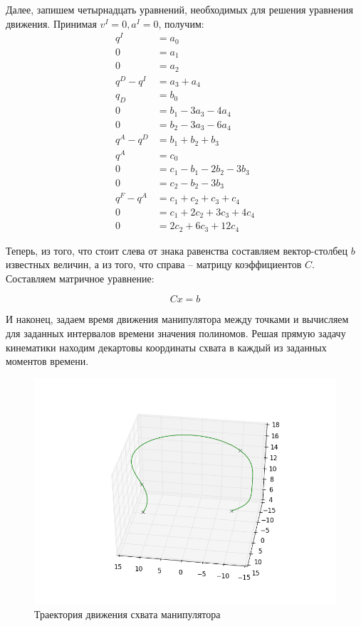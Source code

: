 \documentclass[a4paper,14pt]{extreport}
\begin{document}
	Далее, запишем четырнадцать уравнений, необходимых для решения уравнения движения. Принимая $v^I = 0, a^I = 0$, получим:
	\begin{align*}
		q^I &= a_0\\
		0 &= a_1\\
		0 &= a_2\\
		q^D - q^I &= a_3 + a_4\\
		q_D &= b_0\\
		0 &= b_1 - 3 a_3 - 4 a_4\\
		0 &= b_2 - 3 a_3 - 6 a_4\\
		q^A - q^D &= b_1 + b_2 + b_3\\
		q^A &= c_0\\
		0 &= c_1 - b_1 - 2 b_2 -3 b_3\\
		0 &= c_2 - b_2 - 3 b_3\\
		q^F - q^A &= c_1 + c_2 + c_3 + c_4 \\
		0 &= c_1 + 2 c_2 + 3 c_3 + 4 c_4\\
		0 &= 2 c_2 + 6 c_3 + 12 c_4
	\end{align*}
	
	Теперь, из того, что стоит слева от знака равенства составляем вектор-столбец $b$ известных величин, а из того, что справа -- матрицу коэффициентов $C$. Составляем матричное уравнение:
	
	\begin{equation}
		Cx = b
	\end{equation}
	
	И наконец, задаем время движения манипулятора между точками и вычисляем для заданных интервалов времени значения полиномов. Решая прямую задачу кинематики находим декартовы координаты схвата в каждый из заданных моментов времени.
	
	\begin{figure}[H]
	 	\center\includegraphics[width=1\linewidth]{trajectory2.png}
	 	\caption{Траектория движения схвата манипулятора}
	 	\label{fig:scr1}
	\end{figure}
\end{document}
